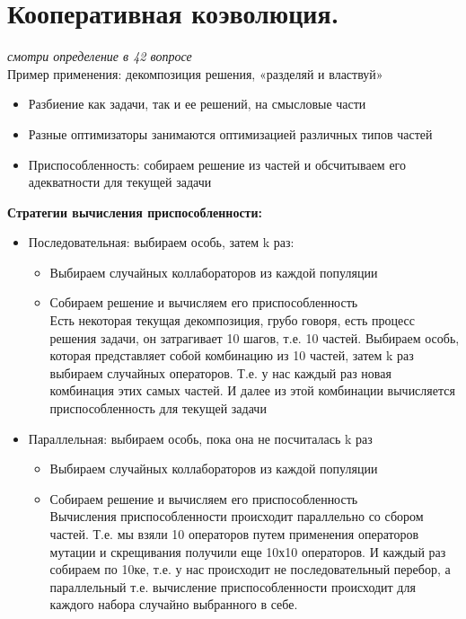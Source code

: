 \section{Кооперативная коэволюция.}
\textit{смотри определение в 42 вопросе}\\
Пример применения: декомпозиция решения, «разделяй и властвуй»
\begin{itemize}
    \item Разбиение как задачи, так и ее решений, на смысловые части
    \item Разные оптимизаторы занимаются оптимизацией различных типов частей
    \item Приспособленность: собираем решение из частей и обсчитываем его адекватности для текущей задачи
\end{itemize}

\textbf{Стратегии вычисления приспособленности:}
\begin{itemize}
    \item Последовательная: выбираем особь, затем k раз:
    \begin{itemize}
        \item Выбираем случайных коллабораторов из каждой популяции
        \item Собираем решение и вычисляем его приспособленность\\
        Есть некоторая текущая декомпозиция, грубо говоря, есть процесс решения задачи, он затрагивает 10 шагов, т.е. 10 частей. Выбираем особь, которая представляет собой комбинацию из 10 частей, затем k раз выбираем случайных операторов. Т.е. у нас каждый раз новая комбинация этих самых частей. И далее из этой комбинации вычисляется приспособленность для текущей задачи 
    \end{itemize}
    \item Параллельная: выбираем особь, пока она не посчиталась k раз
    \begin{itemize}
        \item Выбираем случайных коллабораторов из каждой популяции
        \item Собираем решение и вычисляем его приспособленность\\
        Вычисления приспособленности происходит параллельно со сбором частей. Т.е. мы взяли 10 операторов путем применения операторов мутации и скрещивания получили еще 10х10 операторов. И каждый раз собираем по 10ке, т.е. у нас происходит не последовательный перебор, а параллельный т.е. вычисление приспособленности происходит для каждого набора случайно выбранного в себе.
    \end{itemize}
\end{itemize}
